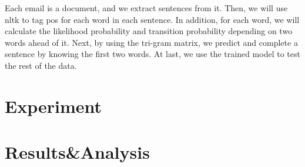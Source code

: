 \documentclass{article}
\begin{document}
\begin{multicols}{2}
Each email is a document, and we extract sentences from it. Then, we will use nltk to tag pos for each word in each sentence. In addition, for each word, we will calculate the likelihood probability and transition probability depending on two words ahead of it. Next, by using the tri-gram matrix, we predict and complete a sentence by knowing the first two words. At last, we use the trained model to test the rest of the data.

\section{Experiment}

\section{Results&Analysis}

\end{multicols}
\end{document}
